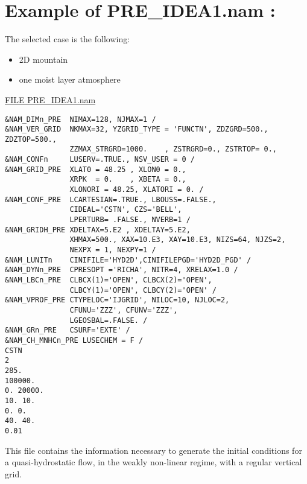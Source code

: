 \section{Example of PRE\_IDEA1.nam : }
The selected case is the following:
\begin{itemize}
\item 2D mountain 
\item  one moist  layer atmosphere
\end{itemize}

\underline{FILE PRE\_IDEA1.nam}

\begin{verbatim}
&NAM_DIMn_PRE  NIMAX=128, NJMAX=1 /
&NAM_VER_GRID  NKMAX=32, YZGRID_TYPE = 'FUNCTN', ZDZGRD=500., ZDZTOP=500., 
               ZZMAX_STRGRD=1000.    , ZSTRGRD=0., ZSTRTOP= 0., 
&NAM_CONFn     LUSERV=.TRUE., NSV_USER = 0 /
&NAM_GRID_PRE  XLAT0 = 48.25 , XLON0 = 0.,
               XRPK  = 0.    , XBETA = 0.,
               XLONORI = 48.25, XLATORI = 0. /
&NAM_CONF_PRE  LCARTESIAN=.TRUE., LBOUSS=.FALSE., 
               CIDEAL='CSTN', CZS='BELL', 
               LPERTURB= .FALSE., NVERB=1 /
&NAM_GRIDH_PRE XDELTAX=5.E2 , XDELTAY=5.E2, 
               XHMAX=500., XAX=10.E3, XAY=10.E3, NIZS=64, NJZS=2, 
               NEXPX = 1, NEXPY=1 /
&NAM_LUNITn    CINIFILE='HYD2D',CINIFILEPGD='HYD2D_PGD' /
&NAM_DYNn_PRE  CPRESOPT ='RICHA', NITR=4, XRELAX=1.0 /
&NAM_LBCn_PRE  CLBCX(1)='OPEN', CLBCX(2)='OPEN', 
               CLBCY(1)='OPEN', CLBCY(2)='OPEN' /
&NAM_VPROF_PRE CTYPELOC='IJGRID', NILOC=10, NJLOC=2,  
               CFUNU='ZZZ', CFUNV='ZZZ',
               LGEOSBAL=.FALSE. /
&NAM_GRn_PRE   CSURF='EXTE' /
&NAM_CH_MNHCn_PRE LUSECHEM = F /
CSTN
2
285.
100000.
0. 20000.
10. 10.
0. 0.
40. 40.
0.01
\end{verbatim}

This file contains the  information necessary to generate the initial 
conditions for a quasi-hydrostatic flow, in the weakly
non-linear regime, with a regular vertical grid.

